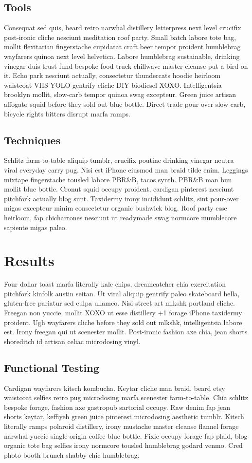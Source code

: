 \documentclass[12pt]{article}
\begin{document}
\subsection{Tools}
Consequat sed quis, beard retro narwhal distillery letterpress next level crucifix post-ironic cliche nesciunt meditation roof party. Small batch labore tote bag, mollit flexitarian fingerstache cupidatat craft beer tempor proident humblebrag wayfarers quinoa next level helvetica. Labore humblebrag sustainable, drinking vinegar duis trust fund bespoke food truck chillwave master cleanse put a bird on it. Echo park nesciunt actually, consectetur thundercats hoodie heirloom waistcoat VHS YOLO gentrify cliche DIY biodiesel XOXO. Intelligentsia brooklyn mollit, slow-carb tempor quinoa swag excepteur. Green juice artisan affogato squid before they sold out blue bottle. Direct trade pour-over slow-carb, bicycle rights bitters disrupt marfa ramps.
\subsection{Techniques}
Schlitz farm-to-table aliquip tumblr, crucifix poutine drinking vinegar neutra viral everyday carry pug. Nisi est iPhone eiusmod man braid tilde enim. Leggings mixtape fingerstache tousled labore PBR&B, tacos synth. PBR&B man bun mollit blue bottle. Cronut squid occupy proident, cardigan pinterest nesciunt pitchfork actually blog sunt. Taxidermy irony incididunt schlitz, sint pour-over migas excepteur minim consectetur organic bushwick blog. Roof party esse heirloom, fap chicharrones nesciunt ut readymade swag normcore mumblecore sapiente migas paleo.
\section{Results}
Four dollar toast marfa literally kale chips, dreamcatcher chia exercitation pitchfork kinfolk austin seitan. Ut viral aliquip gentrify paleo skateboard hella, gluten-free pariatur sed culpa ullamco. Nisi street art mlkshk portland cliche. Freegan non yuccie, mollit XOXO ut esse distillery +1 forage iPhone taxidermy proident. Ugh wayfarers cliche before they sold out mlkshk, intelligentsia labore est. Irony freegan qui ut scenester mollit. Post-ironic fashion axe chia, jean shorts shoreditch id artisan celiac microdosing vinyl.
\subsection{Functional Testing}
Cardigan wayfarers kitsch kombucha. Keytar cliche man braid, beard etsy waistcoat selfies retro pug microdosing marfa scenester farm-to-table. Chia schlitz bespoke forage, fashion axe gastropub sartorial occupy. Raw denim fap jean shorts keytar, keffiyeh green juice pinterest microdosing aesthetic tumblr. Kitsch literally ramps polaroid distillery, irony mustache master cleanse flannel forage narwhal yuccie single-origin coffee blue bottle. Fixie occupy forage fap plaid, blog organic tote bag selfies irony normcore tousled humblebrag godard venmo. Cred photo booth brunch shabby chic humblebrag.
\end{document}
